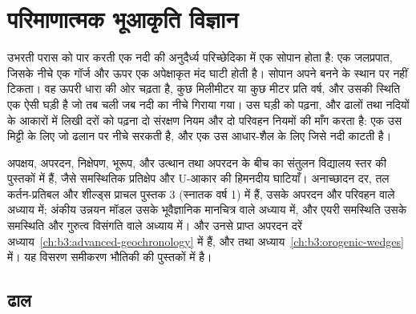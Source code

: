 \chapter{परिमाणात्मक भूआकृति विज्ञान}\label{ch:b3:quantitative-geomorphology}

उभरती परास को पार करती एक नदी की अनुदैर्ध्य परिच्छेदिका में एक सोपान होता है: एक जलप्रपात,
जिसके नीचे एक गॉर्ज और ऊपर एक अपेक्षाकृत मंद घाटी होती है। सोपान अपने बनने के स्थान पर
नहीं टिकता। वह ऊपरी धारा की ओर चढ़ता है, कुछ मिलीमीटर या कुछ मीटर प्रति
वर्ष, और उसकी स्थिति एक ऐसी घड़ी है जो तब चली जब नदी का 
नीचे गिराया गया। उस घड़ी को पढ़ना, और ढालों तथा नदियों के आकारों में लिखी
दरों को पढ़ना दो संरक्षण नियम और दो परिवहन नियमों की माँग करता है: एक उस मिट्टी के लिए
जो ढलान पर नीचे सरकती है, और एक उस आधार-शैल के लिए जिसे नदी काटती है।

\begin{recall}
अपक्षय, अपरदन, निक्षेपण, भूरूप, और उत्थान तथा अपरदन के बीच का संतुलन
विद्यालय स्तर की पुस्तकों में हैं, जैसे समस्थितिक प्रतिक्षेप और U-आकार की
हिमनदीय घाटियाँ। अनाच्छादन दर, तल कर्तन-प्रतिबल और शील्ड्स
प्राचल पुस्तक 3 (स्नातक वर्ष 1) में हैं, उसके अपरदन और परिवहन वाले अध्याय में;
अंकीय उन्नयन मॉडल उसके भूवैज्ञानिक मानचित्र वाले अध्याय में, और एयरी
समस्थिति उसके समस्थिति और गुरुत्व विसंगति वाले अध्याय में।  और उनसे प्राप्त अपरदन दरें
अध्याय~\ref{ch:b3:advanced-geochronology} में हैं, और  तथा 
अध्याय~\ref{ch:b3:orogenic-wedges} में।
यह विसरण समीकरण भौतिकी की पुस्तकों में है।
\end{recall}

\section{ढाल}\label{sec:b3:quantitative-geomorphology:hillslopes}

